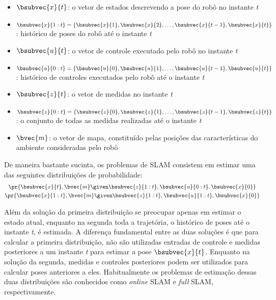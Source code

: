 \begin{itemize}
  \item $\bsubvec{x}{t}$: o vetor de estados descrevendo a pose do robô no instante \emph{t}
  \item $\bsubvec{x}{1:t} = \{ \bsubvec{x}{1}, \bsubvec{x}{2}, \dots, 
  \bsubvec{x}{t-1}, \bsubvec{x}{t} \}$: histórico de poses do robô até o instante \emph{t}
  \item $\bsubvec{u}{t}$: o vetor de controle executado pelo robô no instante \emph{t}
  \item $\bsubvec{u}{0:t} = \{ \bsubvec{u}{0}, \bsubvec{u}{1}, \dots, 
  \bsubvec{u}{t-1}, \bsubvec{u}{t} \}$: histórico de controles executados pelo robô até o instante \emph{t}
  \item $\bsubvec{z}{t}$: o vetor de medidas no instante \emph{t}
  \item $\bsubvec{z}{0:t} = \{ \bsubvec{z}{0}, \bsubvec{z}{1}, \dots, 
  \bsubvec{z}{t-1}, \bsubvec{z}{t} \}$: o conjunto de todas as medidas realizadas até o instante \emph{t}
  \item $\bvec{m}$: o vetor de mapa, constituído pelas posições das características do ambiente consideradas pelo robô
\end{itemize}

De maneira bastante sucinta, os problemas de SLAM consistem em estimar uma das 
seguintes distribuições de probabilidade:
\begin{gather}
  \pr{\bsubvec{x}{t}, \bvec{m} \given \bsubvec{z}{1:t} , \bsubvec{u}{0:t}, 
    \bsubvec{x}{0}}
  \label{eq:online-slam-probability} \\
  \pr{\bsubvec{x}{1:t}, \bvec{m} \given \bsubvec{z}{1:t} , \bsubvec{u}{1:t}, 
    \bsubvec{x}{0}}
  \label{eq:full-slam-probability}
\end{gather}

Além da solução da primeira distribuição se preocupar apenas em estimar o 
estado atual, enquanto na segunda toda a trajetória, o histórico de 
poses até o instante \emph{t}, é estimada. A diferença fundamental entre as 
duas soluções é que para calcular a primeira distribuição, não são utilizadas entradas de controle e medidas posteriores a um instante 
\emph{t} para estimar a pose $\bsubvec{x}{t}$. Enquanto na 
solução da segunda, medidas e controles posteriores podem ser utilizados para 
calcular poses anteriores a eles. Habitualmente os problemas de estimação 
dessas duas distribuições são conhecidos como \textit{online} SLAM e 
\textit{full} SLAM, respectivamente. 


